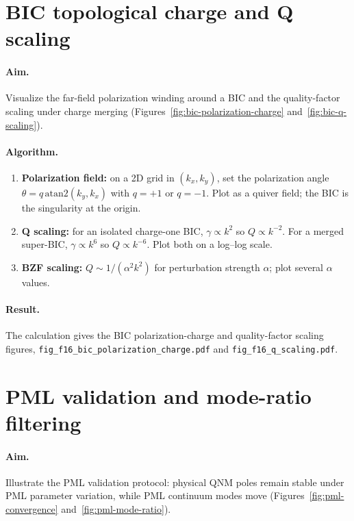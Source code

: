 \section{BIC topological charge and Q scaling}
\label{sec:recipe-bic}

\paragraph{Aim.}
Visualize the far-field polarization winding around a BIC and the
quality-factor scaling under charge merging
(Figures~\ref{fig:bic-polarization-charge}
and~\ref{fig:bic-q-scaling}).

\paragraph{Algorithm.}
\begin{enumerate}
 \item \textbf{Polarization field:} on a 2D grid in $(k_x, k_y)$,
 set the polarization angle $\theta = q\,\mathrm{atan2}(k_y, k_x)$
 with $q = +1$ or $q = -1$. Plot as a quiver field; the BIC is the
 singularity at the origin.
 \item \textbf{Q scaling:} for an isolated charge-one BIC,
 $\gamma \propto k^2$ so $Q \propto k^{-2}$. For a merged super-BIC,
 $\gamma \propto k^6$ so $Q \propto k^{-6}$. Plot both on a
 log--log scale.
 \item \textbf{BZF scaling:} $Q \sim 1/(\alpha^2 k^2)$ for
 perturbation strength $\alpha$; plot several $\alpha$ values.
\end{enumerate}

\paragraph{Result.}
The calculation gives the BIC polarization-charge and quality-factor scaling
figures, \texttt{fig\_f16\_bic\_polarization\_charge.pdf} and
\texttt{fig\_f16\_q\_scaling.pdf}.


\section{PML validation and mode-ratio filtering}
\label{sec:recipe-pml}

\paragraph{Aim.}
Illustrate the PML validation protocol: physical QNM poles remain stable
under PML parameter variation, while PML continuum modes move
(Figures~\ref{fig:pml-convergence} and~\ref{fig:pml-mode-ratio}).

